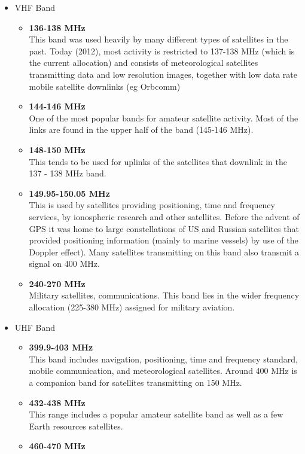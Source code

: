 \documentclass[12pt,a4paper]{report}
\begin{document}
\begin{itemize}
\item VHF Band
	\begin{itemize}
	\item \textbf{136-138 MHz}\\
	This band was used heavily by many different types of satellites in the past. Today (2012), most activity is restricted to 137-138 MHz (which is the current allocation) and consists of meteorological satellites transmitting data and low resolution images, together with low data rate mobile satellite downlinks (eg Orbcomm)
	\item \textbf{144-146 MHz}\\
	One of the most popular bands for amateur satellite activity. Most of the links are found in the upper half of the band (145-146 MHz).
	\item \textbf{148-150 MHz}\\
	This tends to be used for uplinks of the satellites that downlink in the 137 - 138 MHz band.
	\item \textbf{149.95-150.05 MHz}\\
	This is used by satellites providing positioning, time and frequency services, by ionospheric research and other satellites. Before the advent of GPS it was home to large constellations of US and Russian satellites that provided positioning information (mainly to marine vessels) by use of the Doppler effect). Many satellites transmitting on this band also transmit a signal on 400 MHz.
	\item \textbf{240-270 MHz}\\
	Military satellites, communications. This band lies in the wider frequency allocation (225-380 MHz) assigned for military aviation.
	\end{itemize}
\item UHF Band
	\begin{itemize}
	\item \textbf{399.9-403 MHz}\\
	This band includes navigation, positioning, time and frequency standard, mobile communication, and meteorological satellites. Around 400 MHz is a companion band for satellites transmitting on 150 MHz.
	\item \textbf{432-438 MHz}\\
	This range includes a popular amateur satellite band as well as a few Earth resources satellites.
	\item \textbf{460-470 MHz}\\

\end{itemize}
\end{itemize}
\end{document}
